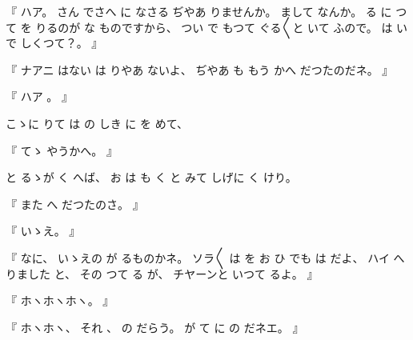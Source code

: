 %
『
ハア。
%
さん
でさへ
に
なさる
ぢやあ
りませんか。
%
%
まして
なんか。
%
る
に
つて
を
りるのが
な
ものですから、
%
つい
で
もつて
ぐる〳〵と
いて
ふので。
%
は
いで
しくつて？。
』

%
『
ナアニ
はない
は
りやあ
ないよ、
%
ぢやあ
も
もう
かへ
だつたのだネ。
』

%
『
ハア
。
』

%
こゝに
りて
は
の
しき
に
を
めて、

%
『
てゝ
やうかへ。
』

%
と
るゝが
く
へば、
%
お
は
も
く
と
みて
しげに
く
けり。

%
『
また
へ
だつたのさ。
』

%
『
いゝえ。
』

%
『
なに、
%
いゝえの
が
るものかネ。
%
ソラ〳〵
は
を
お
ひ
でも
は
だよ、
%
ハイ
へ
りました
と、
%
その
つて
る
が、
%
チヤーンと
いつて
るよ。
』

%
『
ホヽホヽホヽ。
』

%
『
ホヽホヽ、
%
それ
、
%
の
だらう。
%
が
て
に
の
だネエ。
』

